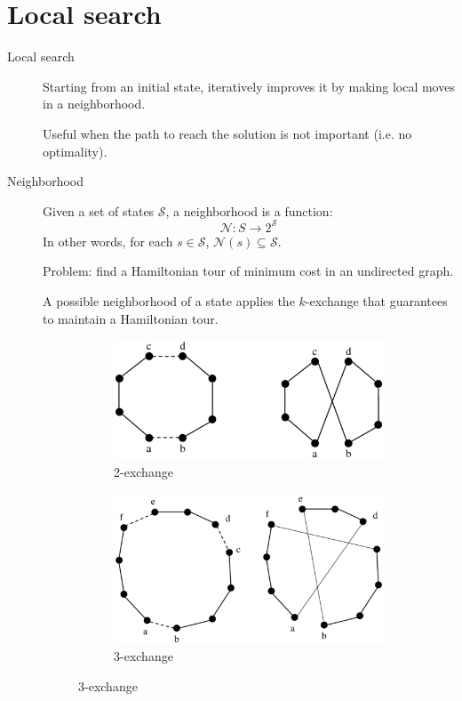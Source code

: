 \chapter{Local search}

\begin{description}
    \item[Local search] 
        Starting from an initial state, iteratively improves it by making local moves in a neighborhood.

        Useful when the path to reach the solution is not important (i.e. no optimality).

    \item[Neighborhood] 
        Given a set of states $\mathcal{S}$, a neighborhood is a function:
        \[ \mathcal{N}: S \rightarrow 2^\mathcal{S} \]
        In other words, for each $s \in \mathcal{S}$, $\mathcal{N}(s) \subseteq \mathcal{S}$.

        \begin{example}
            Problem: find a Hamiltonian tour of minimum cost in an undirected graph.
            
            A possible neighborhood of a state applies the $k$-exchange that guarantees to maintain a Hamiltonian tour.
            \begin{figure}[ht]
                \begin{subfigure}{.5\textwidth}
                    \centering
                    \includegraphics[width=.70\linewidth]{img/tsp_2-exchange.png}
                    \caption{2-exchange}
                \end{subfigure}%
                \begin{subfigure}{.5\textwidth}
                    \centering
                    \includegraphics[width=.70\linewidth]{img/tsp_3-exchange.png}
                    \caption{3-exchange}
                \end{subfigure}
            \end{figure}
        \end{example}


\end{description}

